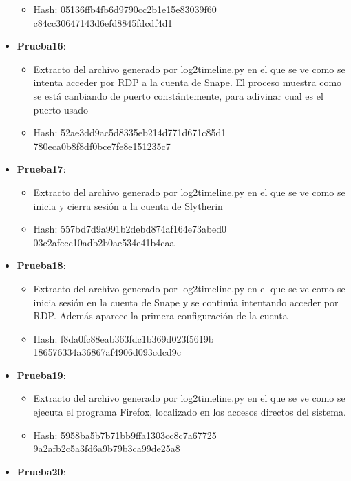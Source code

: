\begin{itemize}
{\begin{itemize}
      \item{Hash}: 05136ffb4fb6d9790cc2b1e15e83039f60\\c84cc30647143d6efd8845fdcdf4d1
    \end{itemize}}
  \item{\textbf{Prueba16}: 
    \begin{itemize}
      \item{Extracto del archivo generado por log2timeline.py en el que se ve como se intenta acceder por RDP a la cuenta de Snape. El proceso muestra como se está canbiando de puerto constántemente, para adivinar cual es el puerto usado}
      \item{Hash}: 52ae3dd9ac5d8335eb214d771d671c85d1\\780eca0b8f8df0bce7fe8e151235c7
    \end{itemize}}
  \item{\textbf{Prueba17}: 
    \begin{itemize}
      \item{Extracto del archivo generado por log2timeline.py en el que se ve como se inicia y cierra sesión a la cuenta de Slytherin}
      \item{Hash}: 557bd7d9a991b2debd874af164e73abed0\\03c2afccc10adb2b0ae534e41b4caa
    \end{itemize}}
  \item{\textbf{Prueba18}: 
    \begin{itemize}
      \item{Extracto del archivo generado por log2timeline.py en el que se ve como se inicia sesión en la cuenta de Snape y se continúa intentando acceder por RDP. Además aparece la primera configuración de la cuenta}
      \item{Hash}: f8da0fc88eab363fdc1b369d023f5619b\\186576334a36867af4906d093cdcd9c
    \end{itemize}}
  \item{\textbf{Prueba19}: 
    \begin{itemize}
      \item{Extracto del archivo generado por log2timeline.py en el que se ve como se ejecuta el programa Firefox, localizado en los accesos directos del sistema.}
      \item{Hash}: 5958ba5b7b71bb9ffa1303cc8c7a67725\\9a2afb2c5a3fd6a9b79b3ca99de25a8
    \end{itemize}}
  \item{\textbf{Prueba20}: 
}
\end{itemize}
